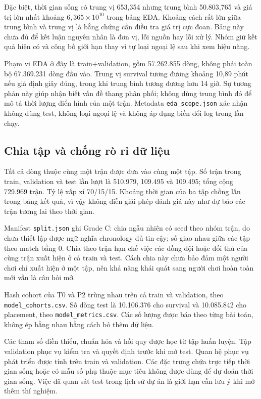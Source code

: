 \documentclass[12pt,a4paper]{article}
\begin{document}
Đặc biệt, thời gian sống có trung vị 653,354 nhưng trung bình 50.803,765 và giá trị lớn nhất khoảng $6,365\times10^{10}$ trong bảng EDA. Khoảng cách rất lớn giữa trung bình và trung vị là bằng chứng cần điều tra giá trị cực đoan. Bảng này chưa đủ để kết luận nguyên nhân là đơn vị, lỗi nguồn hay lỗi xử lý. Nhóm giữ kết quả hiện có và công bố giới hạn thay vì tự loại ngoại lệ sau khi xem hiệu năng.

Phạm vi EDA ở đây là train+validation, gồm 57.262.855 dòng, không phải toàn bộ 67.369.231 dòng đầu vào. Trung vị survival tương đương khoảng 10,89 phút nếu giả định giây đúng, trong khi trung bình tương đương hơn 14 giờ. Sự tương phản này giúp nhận biết vấn đề thang phân phối; không dùng trung bình đó để mô tả thời lượng điển hình của một trận. Metadata \texttt{eda\_scope.json} xác nhận không dùng test, không loại ngoại lệ và không áp dụng biến đổi log trong lần chạy.

\subsection{Chia tập và chống rò rỉ dữ liệu}
Tất cả dòng thuộc cùng một trận được đưa vào cùng một tập. Số trận trong train, validation và test lần lượt là 510.979, 109.495 và 109.495; tổng cộng 729.969 trận. Tỷ lệ xấp xỉ 70/15/15. Khoảng thời gian của ba tập chồng lấn trong bảng kết quả, vì vậy không diễn giải phép đánh giá này như dự báo các trận tương lai theo thời gian.

Manifest \texttt{split.json} ghi Grade C: chia ngẫu nhiên có seed theo nhóm trận, do chưa thiết lập được ngữ nghĩa chronology đủ tin cậy; số giao nhau giữa các tập theo match bằng 0. Chia theo trận hạn chế việc các đồng đội hoặc đối thủ của cùng trận xuất hiện ở cả train và test. Cách chia này chưa bảo đảm một người chơi chỉ xuất hiện ở một tập, nên khả năng khái quát sang người chơi hoàn toàn mới vẫn là câu hỏi mở.

Hash cohort của T0 và P2 trùng nhau trên cả train và validation, theo \nolinkurl{model_cohorts.csv}. Số dòng test là 10.106.376 cho survival và 10.085.842 cho placement, theo \nolinkurl{model_metrics.csv}. Các số lượng được báo theo từng bài toán, không ép bằng nhau bằng cách bỏ thêm dữ liệu.

Các tham số điền thiếu, chuẩn hóa và hồi quy được học từ tập huấn luyện. Tập validation phục vụ kiểm tra và quyết định trước khi mở test. Quan hệ phục vụ phát triển được tính trên train và validation. Các đặc trưng chứa trực tiếp thời gian sống hoặc có mẫu số phụ thuộc mục tiêu không được dùng để dự đoán thời gian sống. Việc đã quan sát test trong lịch sử dự án là giới hạn cần lưu ý khi mở thêm thí nghiệm.
\end{document}
